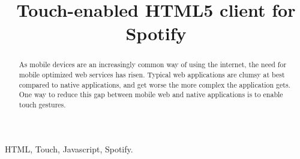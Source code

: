 \documentclass[conference]{IEEEtran}
\begin{document}
%
\title{Touch-enabled HTML5 client for Spotify}


\author{
\and
{}
\and
{}
}





\maketitle


\begin{abstract}
As mobile devices are an increasingly common way of using the internet, the need for
mobile optimized web services has risen. Typical web applications are clumsy at best
compared to native applications, and get worse the more complex the application gets.
One way to reduce this gap between mobile web and native applications is to enable
touch gestures.

\end{abstract}

\begin{IEEEkeywords}
HTML, Touch, Javascript, Spotify.
\end{IEEEkeywords}


%
\IEEEpeerreviewmaketitle
\end{document}
